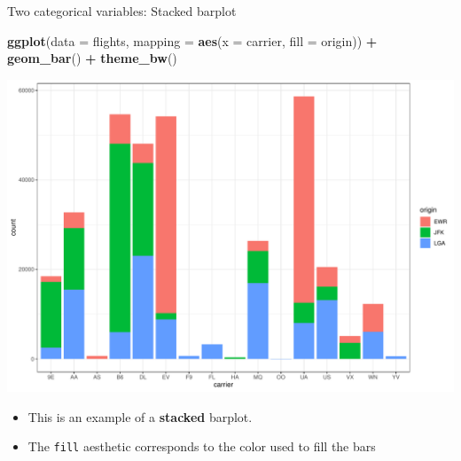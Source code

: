 \documentclass[
  ignorenonframetext,
]{beamer}
\newenvironment{Shaded}{\begin{snugshade}}{\end{snugshade}}
\newcommand{\AttributeTok}[1]{\textcolor[rgb]{0.13,0.29,0.53}{#1}}
\newcommand{\FunctionTok}[1]{\textcolor[rgb]{0.13,0.29,0.53}{\textbf{#1}}}
\newcommand{\NormalTok}[1]{#1}
\newcommand{\SpecialCharTok}[1]{\textcolor[rgb]{0.81,0.36,0.00}{\textbf{#1}}}
\providecommand{\tightlist}{%
  \setlength{\itemsep}{0pt}\setlength{\parskip}{0pt}}
\begin{document}
\begin{frame}[fragile]{Two categorical variables: Stacked barplot}
\protect\hypertarget{two-categorical-variables-stacked-barplot}{}
\tiny

\begin{Shaded}
\begin{Highlighting}[]
\FunctionTok{ggplot}\NormalTok{(}\AttributeTok{data =}\NormalTok{ flights, }\AttributeTok{mapping =} \FunctionTok{aes}\NormalTok{(}\AttributeTok{x =}\NormalTok{ carrier, }\AttributeTok{fill =}\NormalTok{ origin)) }\SpecialCharTok{+}
  \FunctionTok{geom\_bar}\NormalTok{() }\SpecialCharTok{+} 
  \FunctionTok{theme\_bw}\NormalTok{()}
\end{Highlighting}
\end{Shaded}

\begin{center}\includegraphics[width=0.9\linewidth,height=0.5\textheight]{Week2_Lect_files/figure-beamer/unnamed-chunk-41-1} \end{center}
\normalsize

\begin{itemize}
\tightlist
\item
  This is an example of a \textbf{stacked} barplot.
\item
  The \texttt{fill} aesthetic corresponds to the color used to fill the
  bars
\end{itemize}
\end{frame}
\end{document}
